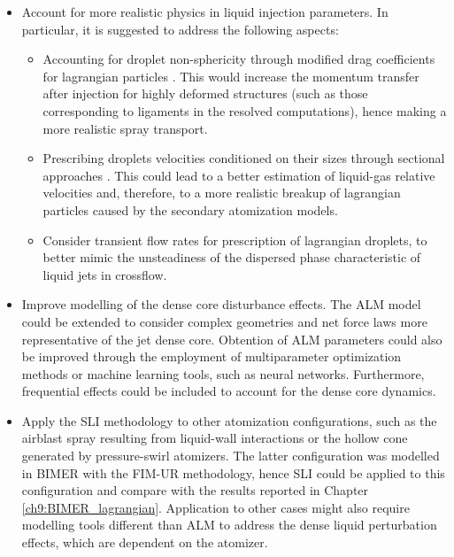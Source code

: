 \begin{itemize}

	\item Account for more realistic physics in liquid injection parameters.  In particular, it is suggested to address the following aspects:
	
	\begin{itemize}
	
		\item Accounting for droplet non-sphericity through modified drag coefficients for lagrangian particles . This would increase the momentum transfer after injection for highly deformed structures (such as those corresponding to ligaments in the resolved computations), hence making a more realistic spray transport. 
		
		\item Prescribing droplets velocities conditioned on their sizes through sectional approaches . This could lead to a better estimation of liquid-gas relative velocities and, therefore, to a more realistic breakup of lagrangian particles caused by the secondary atomization models.
		
		\item Consider transient flow rates for prescription of lagrangian droplets, to better mimic the unsteadiness of the dispersed phase characteristic of liquid jets in crossflow.
	
	\end{itemize}
	
	\item Improve modelling of the dense core disturbance effects. The ALM model could be extended to consider complex geometries and net force laws more representative of the jet dense core. Obtention of ALM parameters could also be improved through the employment of multiparameter optimization methods or machine learning tools, such as neural networks. Furthermore, frequential effects could be included to account for the dense core dynamics.
	
	\item Apply the SLI methodology to other atomization configurations, such as the airblast spray resulting from liquid-wall interactions or the hollow cone generated by pressure-swirl atomizers. The latter configuration was modelled in BIMER with the FIM-UR methodology, hence SLI could be applied to this configuration and compare with the results reported in Chapter \ref{ch9:BIMER_lagrangian}. Application to other cases might also require modelling tools different than ALM to address the dense liquid perturbation effects, which are dependent on the atomizer.
	

\end{itemize}
